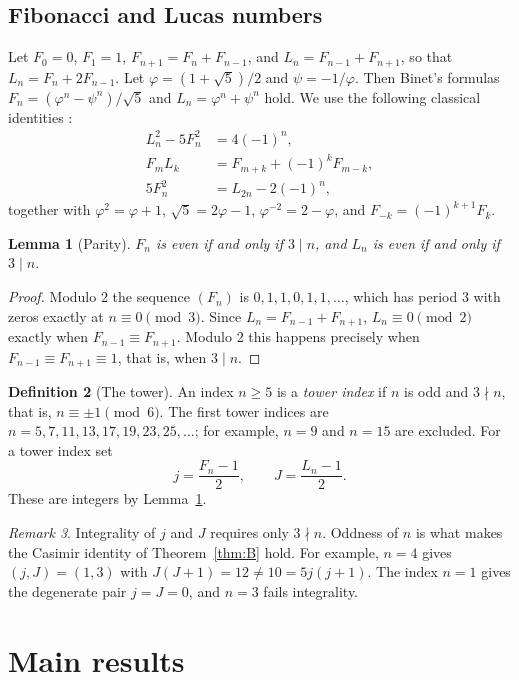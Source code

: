 \documentclass[11pt]{amsart}
\newtheorem{lemma}{Lemma}[section]
\theoremstyle{definition}
\newtheorem{definition}[lemma]{Definition}
\theoremstyle{remark}
\newtheorem{remark}[lemma]{Remark}
\begin{document}
\subsection{Fibonacci and Lucas numbers}
Let $F_0=0$, $F_1=1$, $F_{n+1}=F_n+F_{n-1}$, and $L_n=F_{n-1}+F_{n+1}$, so that $L_n=F_n+2F_{n-1}$. Let $\varphi=(1+\sqrt5)/2$ and $\psi=-1/\varphi$. Then Binet's formulas $F_n=(\varphi^n-\psi^n)/\sqrt5$ and $L_n=\varphi^n+\psi^n$ hold. We use the following classical identities \cite{Vajda,Koshy}:
\begin{align}
L_n^2-5F_n^2&=4(-1)^n,\label{eq:pell}\\
F_mL_k&=F_{m+k}+(-1)^kF_{m-k},\label{eq:FL}\\
5F_n^2&=L_{2n}-2(-1)^n,\label{eq:F2}
\end{align}
together with $\varphi^2=\varphi+1$, $\sqrt5=2\varphi-1$, $\varphi^{-2}=2-\varphi$, and $F_{-k}=(-1)^{k+1}F_k$.

\begin{lemma}[Parity]\label{lem:parity}
$F_n$ is even if and only if $3\mid n$, and $L_n$ is even if and only if $3\mid n$.
\end{lemma}
\begin{proof}
Modulo $2$ the sequence $(F_n)$ is $0,1,1,0,1,1,\dots$, which has period $3$ with zeros exactly at $n\equiv 0\pmod 3$. Since $L_n=F_{n-1}+F_{n+1}$, $L_n\equiv 0\pmod 2$ exactly when $F_{n-1}\equiv F_{n+1}$. Modulo $2$ this happens precisely when $F_{n-1}\equiv F_{n+1}\equiv 1$, that is, when $3\mid n$.
\end{proof}

\begin{definition}[The tower]\label{def:tower}
An index $n\ge 5$ is a \emph{tower index} if $n$ is odd and $3\nmid n$, that is, $n\equiv\pm1\pmod 6$. The first tower indices are $n=5,7,11,13,17,19,23,25,\dots$; for example, $n=9$ and $n=15$ are excluded. For a tower index set
\[
j=\frac{F_n-1}{2},\qquad J=\frac{L_n-1}{2}.
\]
These are integers by Lemma~\ref{lem:parity}.
\end{definition}

\begin{remark}
Integrality of $j$ and $J$ requires only $3\nmid n$. Oddness of $n$ is what makes the Casimir identity of Theorem~\ref{thm:B} hold. For example, $n=4$ gives $(j,J)=(1,3)$ with $J(J+1)=12\ne 10=5j(j+1)$. The index $n=1$ gives the degenerate pair $j=J=0$, and $n=3$ fails integrality.
\end{remark}

\section{Main results}
\end{document}
